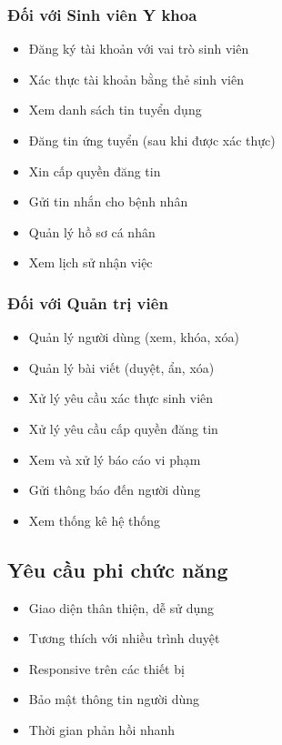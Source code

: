 \documentclass[a4paper,12pt]{report}
\begin{document}
\subsubsection{Đối với Sinh viên Y khoa}
\begin{itemize}
    \item Đăng ký tài khoản với vai trò sinh viên
    \item Xác thực tài khoản bằng thẻ sinh viên
    \item Xem danh sách tin tuyển dụng
    \item Đăng tin ứng tuyển (sau khi được xác thực)
    \item Xin cấp quyền đăng tin
    \item Gửi tin nhắn cho bệnh nhân
    \item Quản lý hồ sơ cá nhân
    \item Xem lịch sử nhận việc
\end{itemize}

\subsubsection{Đối với Quản trị viên}
\begin{itemize}
    \item Quản lý người dùng (xem, khóa, xóa)
    \item Quản lý bài viết (duyệt, ẩn, xóa)
    \item Xử lý yêu cầu xác thực sinh viên
    \item Xử lý yêu cầu cấp quyền đăng tin
    \item Xem và xử lý báo cáo vi phạm
    \item Gửi thông báo đến người dùng
    \item Xem thống kê hệ thống
\end{itemize}

\subsection{Yêu cầu phi chức năng}
\begin{itemize}
    \item Giao diện thân thiện, dễ sử dụng
    \item Tương thích với nhiều trình duyệt
    \item Responsive trên các thiết bị
    \item Bảo mật thông tin người dùng
    \item Thời gian phản hồi nhanh
\end{itemize}
\end{document}
